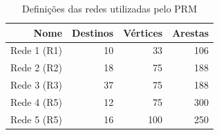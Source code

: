 \begin{table}[!htbp]
	\centering
	\caption{Definições das redes utilizadas pelo PRM}
	\label{tab_prm_redes}
	\begin{tabular}{r|rrr}
		Nome        & Destinos & Vértices & Arestas \\ \hline
		Rede 1 (R1) & 10       & 33       & 106     \\
		Rede 2 (R2) & 18       & 75       & 188     \\
		Rede 3 (R3) & 37       & 75       & 188     \\
		Rede 4 (R5) & 12       & 75       & 300     \\
		Rede 5 (R5) & 16       & 100      & 250     \\ \hline
	\end{tabular}
\end{table}
